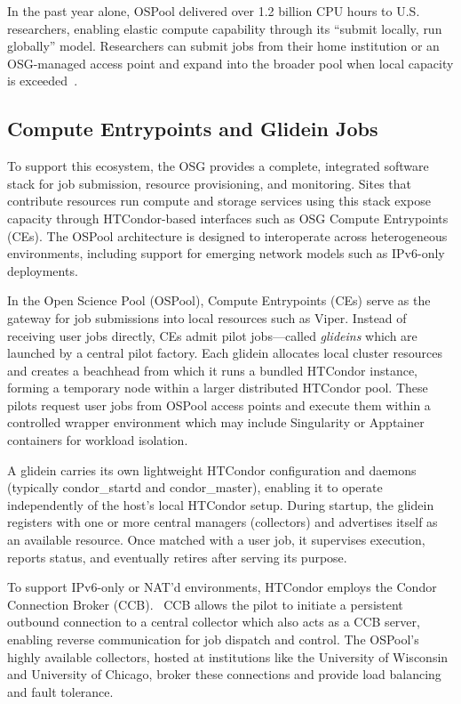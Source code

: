 \documentclass[11pt]{article}
\begin{document}
In the past year alone, OSPool delivered over 1.2 billion CPU hours to U.S. researchers, enabling elastic compute capability through its “submit locally, run globally” model. Researchers can submit jobs from their home institution or an OSG-managed access point and expand into the broader pool when local capacity is exceeded~\cite{ospoolutil}.


\subsection{Compute Entrypoints and Glidein Jobs}
To support this ecosystem, the OSG provides a complete, integrated software stack for job submission, resource provisioning, and monitoring. Sites that contribute resources run compute and storage services using this stack expose capacity through HTCondor-based interfaces such as OSG Compute Entrypoints (CEs). The OSPool architecture is designed to interoperate across heterogeneous environments, including support for emerging network models such as IPv6-only deployments.

In the Open Science Pool (OSPool), Compute Entrypoints (CEs) serve as the gateway for job submissions into local resources such as Viper. Instead of receiving  user jobs directly, CEs admit pilot jobs—called {\it glideins} which are launched by a central pilot factory. Each glidein allocates local cluster resources and creates a beachhead from which it runs a bundled HTCondor instance, forming a temporary node within a larger distributed HTCondor pool. These pilots request user jobs from OSPool access points and execute them within a controlled wrapper environment which may include Singularity or Apptainer containers for workload isolation.~\cite{htcondor,glideinwms}

A glidein carries its own lightweight HTCondor configuration and daemons (typically condor\_startd and condor\_master), enabling it to operate independently of the host's local HTCondor setup. During startup, the glidein registers with one or more central managers (collectors) and advertises itself as an available resource. Once matched with a user job, it supervises execution, reports status, and eventually retires after serving its purpose.

To support IPv6-only or NAT'd environments, HTCondor employs the Condor Connection Broker (CCB).~\cite{ccbdesign} CCB allows the pilot to initiate a persistent outbound connection to a central collector which also acts as a CCB server, enabling reverse communication for job dispatch and control. The OSPool's highly available collectors, hosted at institutions like the University of Wisconsin and University of Chicago, broker these connections and provide load balancing and fault tolerance.
\end{document}
